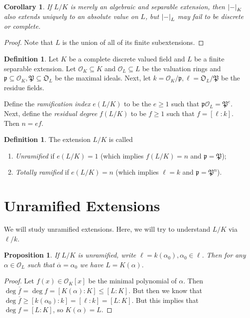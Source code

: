\documentclass[leqno, openany]{memoir}
\newtheorem{cor}[thm]{Corollary}
\newtheorem{prop}[thm]{Proposition}
\theoremstyle{definition}
\newtheorem{defn}[thm]{Definition}
\theoremstyle{remark}
\theoremstyle{plain}
\theoremstyle{definition}
\theoremstyle{remark}
\newcommand{\mc}[1]{\mathcal{#1}}
\newcommand{\mf}[1]{\mathfrak{#1}}
\newcommand{\ol}[1]{\overline{#1}}
\begin{document}
\begin{cor} If $L/K$ is merely an algebraic and separable extension, then
$\abs{-}_K$ also extends uniquely to an absolute value on $L$, but $\abs{-}_L$
may fail to be discrete or complete.  \end{cor}

\begin{proof} Note that $L$ is the union of all of its finite subextensions.
\end{proof}

\begin{defn} Let $K$ be a complete discrete valued field and $L$ be a finite
    separable extension. Let $\mc{O}_K \subseteq K$ and $\mc{O}_L \subseteq L$
    be the valuation rings and $\mf{p} \subseteq \mc{O}_K, \mf{P} \subseteq
    \mf{O}_L$ be the maximal ideals. Next, let $k = \mc{O}_K/\mf{p}, \ell =
    \mf{O}_L / \mf{P}$ be the residue fields. 

    Define the \textit{ramification index} $e(L/K)$ to be the $e \geq 1$ such
that $\mf{p} \mc{O}_L = \mf{P}^e$. Next, define the \textit{residual degree}
$f(L/K)$ to be $f \geq 1$ such that $f = [\ell : k]$. Then $n = ef$.
\end{defn}

\begin{defn} The extension $L/K$ is called \begin{enumerate} \item
    \textit{Unramified} if $e(L/K) = 1$ (which implies $f(L/K) = n$ and $\mf{p}
    = \mf{P}$); \item \textit{Totally ramified} if $e(L/K) = n$ (which implies
    $\ell = k$ and $\mf{p} = \mf{P}^n$).  \end{enumerate} \end{defn}

\section{Unramified Extensions}%

We will study unramified extensions. Here, we will try to understand $L/K$ via
$\ell / k$.

\begin{prop} If $L/K$ is unramified, write $\ell = k(\alpha_0), \alpha_0 \in
\ell$. Then for any $\alpha \in \mc{O}_L$ such that $\ol{\alpha} = \alpha_0$ we
have $L = K(\alpha)$.  \end{prop}

\begin{proof} Let $f(x) \in \mc{O}_K[x]$ be the minimal polynomial of $\alpha$.
    Then $\deg \ol{f} = \deg f = [K(\alpha) : K] \leq [L:K]$. But then we know
    that $\deg \ol{f} \geq [k(\alpha_0) : k] = [\ell : k] = [L:K]$. But this
    implies that $\deg f = [L:K]$, so $K(\alpha) = L$.  \end{proof}
\end{document}
